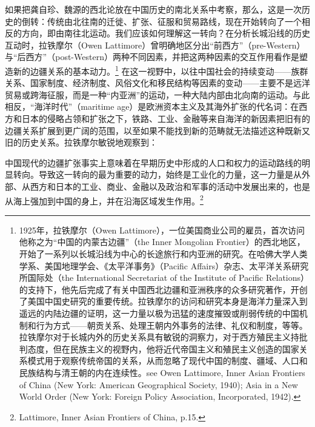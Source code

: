 \documentclass[a4paper, 12pt, openright]{ctexbook}
\renewenvironment{quote}
  {\list{}{\rightmargin2\ccwd \leftmargin2\ccwd \itemindent=2\ccwd \listparindent=2\ccwd}%
   \item\relax\small\kaishu\color{black}}
  {\endlist}
\begin{document}
如果把龚自珍、魏源的西北论放在中国历史的南北关系中考察，那么，这是一次历史的倒转：传统由北往南的迁徙、扩张、征服和贸易路线，现在开始转向了一个相反的方向，即由南往北运动。我们应该如何理解这一转向？在分析长城沿线的历史互动时，拉铁摩尔（Owen Lattimore）曾明确地区分出“前西方”（pre-Western）与“后西方”（post-Western）两种不同因素，并把这两种因素的交互作用看作是塑造新的边疆关系的基本动力。\footnote{1925年，拉铁摩尔（Owen Lattimore），一位美国商业公司的雇员，首次访问他称之为“中国的内蒙古边疆”（the Inner Mongolian Frontier）的西北地区，开始了一系列以长城沿线为中心的长途旅行和内亚洲的研究。在哈佛大学人类学系、美国地理学会、《太平洋事务》（Pacific Affairs）杂志、太平洋关系研究所国际处（the International Secretariat of the Institute of Pacific Relations）的支持下，他先后完成了有关中国西北边疆和亚洲秩序的众多研究著作，开创了美国中国史研究的重要传统。拉铁摩尔的访问和研究本身是海洋力量深入到遥远的内陆边疆的证明，这一力量以极为迅猛的速度摧毁或削弱传统的中国机制和行为方式——朝贡关系、处理王朝内外事务的法律、礼仪和制度，等等。拉铁摩尔对于长城内外的历史关系具有敏锐的洞察力，对于西方殖民主义持批判态度，但在民族主义的视野内，他将近代帝国主义和殖民主义创造的国家关系模式用于观察传统帝国的关系，从而忽略了现代中国的制度、疆域、人口和民族结构与清王朝的内在连续性。see Owen Lattimore, Inner Asian Frontiers of China (New York: American Geographical Society, 1940); Asia in a New World Order (New York: Foreign Policy Association, Incorporated, 1942).} 在这一视野中，以往中国社会的持续变动——族群关系、国家制度、经济制度、风俗文化和移民结构等因素的变动——主要不是远洋贸易或跨海征服，而是一种“内亚洲”的运动，一种大陆内部由北向南的运动。与此相反，“海洋时代”（maritime age）是欧洲资本主义及其海外扩张的代名词：在西方和日本的侵略占领和扩张之下，铁路、工业、金融等来自海洋的新因素把旧有的边疆关系扩展到更广阔的范围，以至如果不能找到新的范畴就无法描述这种既新又旧的历史关系。拉铁摩尔敏锐地观察到：

\begin{quote}
中国现代的边疆扩张事实上意味着在早期历史中形成的人口和权力的运动路线的明显转向。导致这一转向的最为重要的动力，始终是工业化的力量，这一力量是从外部、从西方和日本的工业、商业、金融以及政治和军事的活动中发展出来的，也是从海上强加到中国的身上，并在沿海区域发生作用。\footnote{Lattimore, Inner Asian Frontiers of China, p.15.}
\end{quote}
\end{document}

